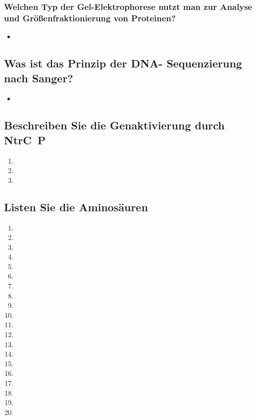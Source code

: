 \documentclass{article}
\begin{document}
\subsubsection*{Welchen Typ der Gel-Elektrophorese nutzt
man zur Analyse und Größenfraktionierung
von Proteinen?}
\begin{itemize}     \item  \end{itemize}
\subsection*{Was ist das Prinzip der DNA-
Sequenzierung nach Sanger?}
\begin{itemize}     \item  \end{itemize} \bigskip\bigskip
\subsection*{Beschreiben Sie die
Genaktivierung durch NtrC~P}
\begin{enumerate}
    \item 
\item 
\item 
\end{enumerate}

\subsection*{Listen Sie die Aminosäuren}
\begin{enumerate}
    \item \item \item \item 
    \item \item \item \item 
    \item \item \item \item 
    \item \item \item \item 
    \item \item \item \item 
\end{enumerate}
\end{document}
